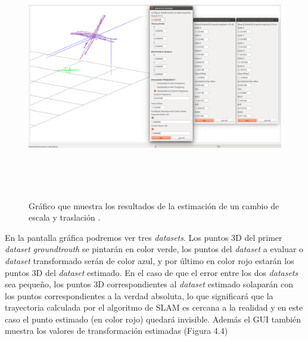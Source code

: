 \begin{figure}[H]
\begin{center}
\label{fig:opciones de View}\includegraphics[height=10.0cm,width=15.0cm]{img/cap6/Escala_Trasla_Rota_Offset_Gauss_CosmicNoise_abba.png}
\hspace{0.5cm}

\end{center}

\caption{Gráfico que muestra los resultados de la estimación de un cambio de escala y traslación .}
\end{figure}

En la pantalla gráfica podremos ver tres \textit{datasets}. Los puntos 3D del primer \textit{dataset} \textit{groundtrouth} se pintarán en color verde, los puntos del \textit{dataset} a evaluar o \textit{dataset} transformado serán de color azul, y por último en color rojo estarán los puntos 3D del \textit{dataset} estimado.
En el caso de que el error entre los dos \textit{datasets} sea pequeño, los puntos 3D correspondientes al \textit{dataset} estimado solaparán con los puntos correspondientes a la verdad absoluta, lo que significará que la trayectoria calculada por el algoritmo de SLAM es cercana a la realidad y en este caso el punto estimado (en color rojo) quedará invisible. Además el GUI también muestra los valores de transformación estimadas (Figura 4.4)




